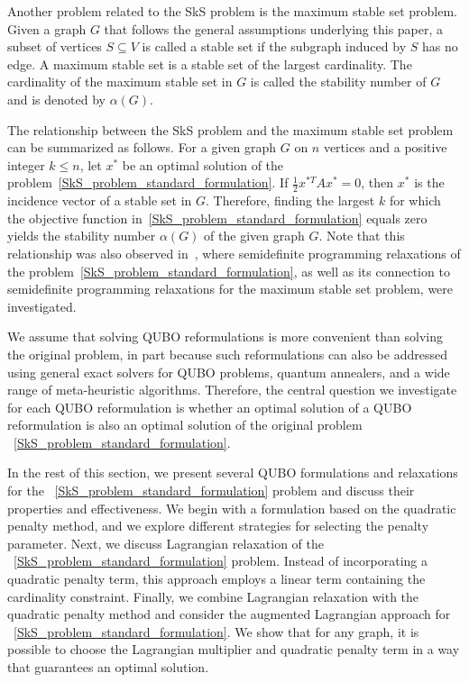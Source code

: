 \documentclass{article}
\begin{document}
Another problem related to the SkS problem is the maximum stable set problem. Given a graph $G$ that follows the general assumptions underlying this paper, a subset of vertices $S \subseteq V$ is called a stable set if the subgraph induced by $S$ has no edge. A maximum stable set is a stable set of the largest cardinality. The cardinality of the maximum stable set in $G$ is called the stability number of $G$ and is denoted by $\alpha(G)$. 

The relationship between the SkS problem and the maximum stable set problem can be summarized as follows. For a given graph $G$ on $n$ vertices and a positive integer $k \leq n$, let $x^*$ be an optimal solution of the problem~\eqref{SkS_problem_standard_formulation}. If $\frac{1}{2}x^{*T} A x^* = 0$, then $x^*$ is the incidence vector of a stable set in $G$. Therefore, finding the largest $k$ for which the objective function in~\eqref{SkS_problem_standard_formulation} equals zero yields the stability number $\alpha(G)$ of the given graph $G$. Note that this relationship was also observed in~\cite{PuchRen2023}, where semidefinite programming relaxations of the problem~\eqref{SkS_problem_standard_formulation}, as well as its connection to semidefinite programming relaxations for the maximum stable set problem, were investigated.

We assume that solving QUBO reformulations is more convenient than solving the original problem, in part because such reformulations can also be addressed using general exact solvers for QUBO problems, quantum annealers, and a wide range of meta-heuristic algorithms. Therefore, the central question we investigate for each QUBO reformulation is whether an optimal solution of a QUBO reformulation is also an optimal solution of the original problem ~\eqref{SkS_problem_standard_formulation}.

In the rest of this section,  we present several QUBO formulations and relaxations for the ~\eqref{SkS_problem_standard_formulation} problem and discuss their properties and effectiveness. 
We begin with a formulation based on the  quadratic penalty method, and we explore different strategies for selecting the penalty parameter.
Next, we discuss Lagrangian relaxation of the ~\eqref{SkS_problem_standard_formulation} problem. Instead of incorporating a quadratic penalty term, this approach employs a linear term containing the cardinality constraint. 
Finally, we combine Lagrangian relaxation with the quadratic penalty method and consider the augmented Lagrangian approach for ~\eqref{SkS_problem_standard_formulation}. We show that for any graph, it is possible to choose the Lagrangian multiplier and quadratic penalty term in a way that guarantees an optimal solution. 
\end{document}
